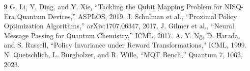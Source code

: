 \documentclass[11pt]{article}
\begin{document}
\begin{thebibliography}{9}
 G. Li, Y. Ding, and Y. Xie, ``Tackling the Qubit Mapping Problem for NISQ-Era Quantum Devices,'' ASPLOS, 2019.
 J. Schulman et al., ``Proximal Policy Optimization Algorithms,'' arXiv:1707.06347, 2017.
 J. Gilmer et al., ``Neural Message Passing for Quantum Chemistry,'' ICML, 2017.
 A. Y. Ng, D. Harada, and S. Russell, ``Policy Invariance under Reward Transformations,'' ICML, 1999.
 N. Quetschlich, L. Burgholzer, and R. Wille, ``MQT Bench,'' Quantum 7, 1062, 2023.
\end{thebibliography}
\end{document}
